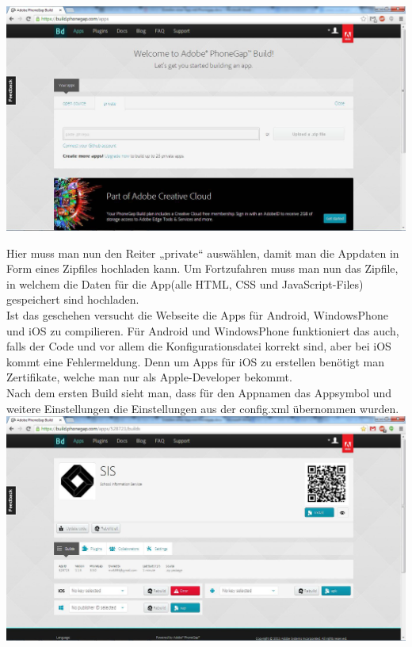 \includegraphics[keepaspectratio=true, width=14cm]{images/phoneGap/PhoneGap1.png}

Hier muss man nun den Reiter „private“ auswählen, damit man die Appdaten in Form eines Zipfiles hochladen kann.
Um Fortzufahren muss man nun das Zipfile, in welchem die Daten für die App(alle HTML, CSS und JavaScript-Files) gespeichert sind hochladen.\\
Ist das geschehen versucht die Webseite die Apps für Android, WindowsPhone und iOS zu compilieren. Für Android und WindowsPhone funktioniert das auch, falls der Code und vor allem die Konfigurationsdatei korrekt sind, aber bei iOS kommt eine Fehlermeldung. Denn um Apps für iOS zu erstellen benötigt man Zertifikate, welche man nur als Apple-Developer bekommt.\\
Nach dem ersten Build sieht man, dass für den Appnamen das Appsymbol und weitere Einstellungen die Einstellungen aus der config.xml übernommen wurden.\\

\includegraphics[keepaspectratio=true, width=14cm]{images/phoneGap/PhoneGap2.png}

